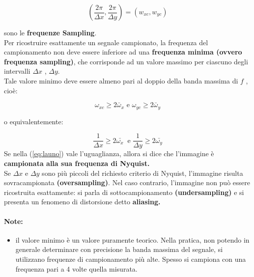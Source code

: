 $$
    (\frac{2\pi}{\Delta x}, \frac{2 \pi}{\Delta y}) = (w_{xc}, w_{yc})
$$

sono le \textbf{frequenze Sampling}.\\

Per ricostruire esattamente un segnale
campionato, la frequenza del campionamento non deve essere inferiore ad una
\textbf{frequenza minima (ovvero frequenza sampling)}, che corrisponde ad un
valore massimo per ciascuno degli intervalli $\Delta x$ , $\Delta y$.\\

Tale
valore minimo deve essere almeno pari al doppio della banda massima di $f$ ,
cioè:

\begin{equation}\label{eq:launo}
    \omega_{xc} \geq 2 \bar{\omega}_x \text{ e } \omega_{yc} \geq 2 \bar{\omega}_y
\end{equation}

o equivalentemente:

$$
    \frac{1}{\Delta x} \ge 2 \bar{\omega_x} \ \text{ e } \frac{1}{\Delta y} \ge 2 \bar{\omega_y}
$$
Se nella (\ref{eq:launo}) vale l'uguaglianza, allora si dice che l'immagine è
\textbf{campionata alla sua frequenza di Nyquist.}\\

Se $\Delta x$ e $\Delta y$ sono più piccoli del richiesto criterio di
Nyquist, l'immagine risulta sovracampionata \textbf{(oversampling)}. Nel caso
contrario, l'immagine non può essere ricostruita esattamente: si parla di
sottocampionamento \textbf{(undersampling)} e si presenta un fenomeno di
distorsione detto \textbf{aliasing.}

\paragraph{Note:}
\begin{itemize}
    \item il valore minimo è un valore puramente teorico. Nella pratica, non
          potendo in generale determinare con precisione la banda massima del
          segnale, si utilizzano frequenze di campionamento più alte. Spesso
          si campiona con una frequenza pari a 4 volte quella misurata.
\end{itemize}

